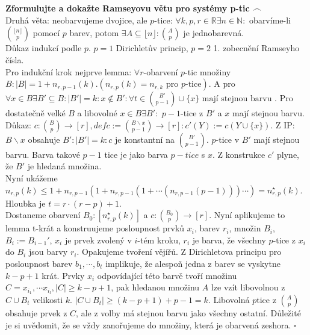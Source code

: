 \documentclass[a4paper]{article}
\newcommand{\fr}{$\frown$}
\newcommand{\led}{\hspace{0.2cm}$\square$}
\newcommand{\hlava}[1]{\text{} \\ \text{} \\ \text{} \hspace{-0.27cm} \textbf{#1} \\}
\begin{document}
\hlava{Zformulujte a dokažte Ramseyovu větu pro systémy p-tic \fr}
Druhá věta: neobarvujeme dvojice, ale $p$-tice: $\forall k, p, r \in \mathbb{R} \exists n\in \mathbb{N}: $ obarvíme-li ${ { \lfloor n \rfloor } \choose p}$ pomocí $p$ barev, potom $\exists A \subseteq \lfloor n \rfloor: { A \choose p} $ je jednobarevná. \\
Důkaz indukcí podle $p$. $p=1$ Dirichletův princip, $p=2$ 1. zobecnění Ramseyho čísla. \\
Pro indukční krok nejprve lemma: $\forall r$-obarvení $p$-tic množiny $B: |B| = 1 + n_{r,p-1}(k). (n_{r,p}(k) = n_{r,k} \text{ pro $p$-tice})$. A pro $\forall x \in B \exists B' \subseteq B: |B'| = k: x \notin B': \forall t \in { B' \choose {p-1}} \cup \{x\} \text{ mají stejnou barvu }$. Pro dostatečně velké $B$ a libovolné $x \in B \exists B': $ $p-1$-tice z $B'$ a $x$ mají stejnou barvu. \\
Důkaz: $c: {B \choose p} \rightarrow [ r ], def c:= { {B \backslash x} \choose p-1} \rightarrow [ r ]: c'(Y) := c(Y \cup \{x\})$. Z IP: $B \backslash x$ obsahuje $B': |B'| = k: c $ je konstantní na ${B' \choose p-1}$. $p$-tice v $B'$ mají stejnou barvu. Barva takové $p-1$ tice je jako barva $p-tice$ s $x$.  Z konstrukce $c'$ plyne, že $B'$ je hledaná množina. \\
Nyní ukážeme $n_{r,p}(k) \le 1+n_{r,p-1}(1+n_{r,p-1}(1+ \cdots (n_{r,p-1}(p-1)))\cdots) = n_{r,p}^\star(k)$. Hloubka je $t = r\cdot(r-p)+1$. \\
Dostaneme obarvení $B_0:[n_{r,p}^\star(k)]$ a $c: {B_0 \choose p} \rightarrow [r]$. Nyní aplikujeme to lemma t-krát a konstruujeme posloupnost prvků $x_i$, barev $r_i$, množin $B_i$, $B_i := B_{i-1}'$, $x_i$ je prvek zvolený v $i$-tém kroku, $r_i$ je barva, že všechny $p$-tice z $x_i$ do $B_i$ jsou barvy $r_i$. Opakujeme tvoření vějířů. Z Dirichletova principu pro posloupnost barev $b_1, \cdots, b_t$ implikuje, že alespoň jedna z barev se vyskytne $k-p+1$ krát. Prvky $x_i$ odpovídající této barvě tvoří množinu $C = {x_{i_1}, \cdots x_{i_l}}, |C| \ge k -p +1$, pak hledanou množinu $A$ lze vzít libovolnou z $C \cup B_t$ velikosti $k$. $|C\cup B_t| \ge (k-p+1)+p-1 = k$. Libovolná $p$tice z ${ A \choose p}$ obsahuje prvek z $C$, ale z volby má stejnou barvu jako všechny ostatní. Důležité je si uvědomit, že se vždy zanořujeme do množiny, která je obarvená zeshora. \led
\end{document}
